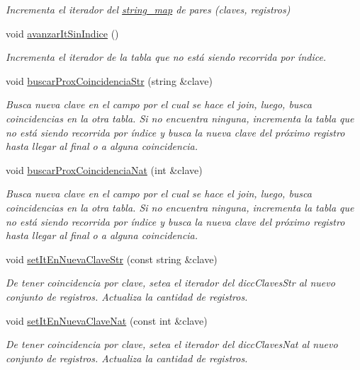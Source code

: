 \begin{DoxyCompactItemize}
\begin{DoxyCompactList}\small\item\em Incrementa el iterador del \mbox{\hyperlink{classstring__map}{string\+\_\+map}} de pares (claves, registros) \end{DoxyCompactList}\item 
void \mbox{\hyperlink{classBaseDeDatos_1_1join__iterator_a702f207cc0e5de5f81a20b244ae289a1}{avanzar\+It\+Sin\+Indice}} ()
\begin{DoxyCompactList}\small\item\em Incrementa el iterador de la tabla que no está siendo recorrida por índice. \end{DoxyCompactList}\item 
void \mbox{\hyperlink{classBaseDeDatos_1_1join__iterator_a92d071b625b37f77d15ee1b2dd82ae3d}{buscar\+Prox\+Coincidencia\+Str}} (string \&clave)
\begin{DoxyCompactList}\small\item\em Busca nueva clave en el campo por el cual se hace el join, luego, busca coincidencias en la otra tabla. Si no encuentra ninguna, incrementa la tabla que no está siendo recorrida por índice y busca la nueva clave del próximo registro hasta llegar al final o a alguna coincidencia. \end{DoxyCompactList}\item 
void \mbox{\hyperlink{classBaseDeDatos_1_1join__iterator_aaadfa593ce2a3e0e2ab80dca1925c7cc}{buscar\+Prox\+Coincidencia\+Nat}} (int \&clave)
\begin{DoxyCompactList}\small\item\em Busca nueva clave en el campo por el cual se hace el join, luego, busca coincidencias en la otra tabla. Si no encuentra ninguna, incrementa la tabla que no está siendo recorrida por índice y busca la nueva clave del próximo registro hasta llegar al final o a alguna coincidencia. \end{DoxyCompactList}\item 
void \mbox{\hyperlink{classBaseDeDatos_1_1join__iterator_af75048242013b8fac69633c2626715df}{set\+It\+En\+Nueva\+Clave\+Str}} (const string \&clave)
\begin{DoxyCompactList}\small\item\em De tener coincidencia por clave, setea el iterador del dicc\+Claves\+Str al nuevo conjunto de registros. Actualiza la cantidad de registros. \end{DoxyCompactList}\item 
void \mbox{\hyperlink{classBaseDeDatos_1_1join__iterator_a9aff1c7b280f0abcc05ffc4864a10ba5}{set\+It\+En\+Nueva\+Clave\+Nat}} (const int \&clave)
\begin{DoxyCompactList}\small\item\em De tener coincidencia por clave, setea el iterador del dicc\+Claves\+Nat al nuevo conjunto de registros. Actualiza la cantidad de registros. \end{DoxyCompactList}\end{DoxyCompactItemize}

